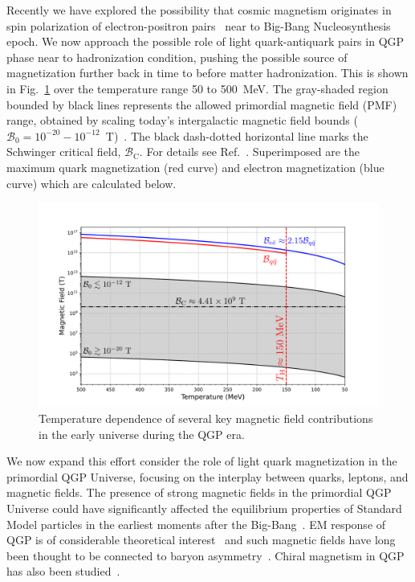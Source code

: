 \documentclass[epjST]{svjour}
\begin{document}
Recently we have explored the possibility that cosmic magnetism originates in spin polarization of electron-positron pairs~\cite{Steinmetz:2023nsc,Steinmetz:2023ucp} near to Big-Bang Nucleosynthesis~\cite{Grayson:2023flr,Grayson:2024uwg} epoch. We now approach the possible role of light quark-antiquark pairs in QGP phase near to hadronization condition, pushing the possible source of magnetization further back in time to before matter hadronization. This is shown in Fig.~\ref{Figure_1} over the temperature range 50 to 500~MeV. The gray-shaded region bounded by black lines represents the allowed primordial magnetic field (PMF) range, obtained by scaling today’s intergalactic magnetic field bounds (\(\mathcal{B}_{0} = 10^{-20}-10^{-12}\)~T)~\cite{Planck:2015zrl,Jedamzik:2018itu}. The black dash-dotted horizontal line marks the Schwinger critical field, \(\mathcal{B}_\mathrm{C}\). For details see Ref.~\cite{Steinmetz:2023nsc}. Superimposed are the maximum quark magnetization (red curve) and electron magnetization (blue curve) which are calculated below.

\begin{figure}
\centerline{
\includegraphics[width=0.875\columnwidth]{python/Figure_1.png}}
\caption{\label{Figure_1}Temperature dependence of several key magnetic field contributions in the early universe during the QGP era.}
\end{figure}

We now expand this effort consider the role of light quark magnetization in the primordial QGP Universe, focusing on the interplay between quarks, leptons, and magnetic fields. The presence of strong magnetic fields in the primordial QGP Universe could have significantly affected the equilibrium properties of Standard Model particles in the earliest moments after the Big-Bang~\cite{Durrer:2013pga,Subramanian:2015lua}. EM response of QGP is of considerable theoretical interest~\cite{Grayson:2022asf,Shovkovy:2022bnd,Ghosh:2024fkg} and such magnetic fields have long been thought to be connected to baryon asymmetry~\cite{Vachaspati:1991nm,Baym:1995fk}. Chiral magnetism in QGP has also been studied~\cite{Fukushima:2008xe,Boyarsky:2011uy,Bali:2011qj}.
 
\end{document}
